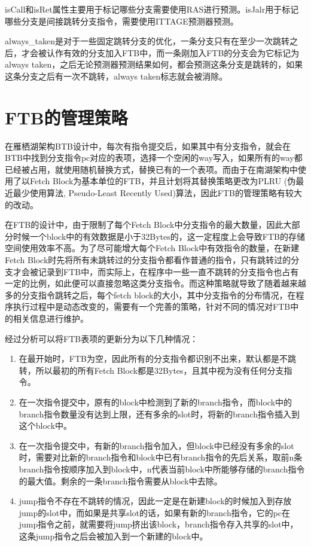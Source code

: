 isCall和isRet属性主要用于标记哪些分支需要使用RAS进行预测。isJalr用于标记哪些分支是间接跳转分支指令，需要使用ITTAGE预测器预测。

always\_taken是对于一些固定跳转分支的优化，一条分支只有在至少一次跳转之后，才会被认作有效的分支加入FTB中，而一条刚加入FTB的分支会为它标记为always taken，之后无论预测器预测结果如何，都会预测这条分支是跳转的，如果这条分支之后有一次不跳转，always taken标志就会被消除。

\section{FTB的管理策略}

在雁栖湖架构BTB设计中，每次有指令提交后，如果其中有分支指令，就会在BTB中找到分支指令pc对应的表项，选择一个空闲的way写入，如果所有的way都已经被占用，就使用随机替换方式，替换已有的一个表项。而由于在南湖架构中使用了以Fetch Block为基本单位的FTB，并且计划将其替换策略更改为PLRU (伪最近最少使用算法, Pseudo-Least Recently Used)算法，因此FTB的管理策略有较大的改动。

在FTB的设计中，由于限制了每个Fetch Block中分支指令的最大数量，因此大部分时候一个block中的有效数据是小于32Bytes的，这一定程度上会导致FTB的存储空间使用效率不高。为了尽可能增大每个Fetch Block中有效指令的数量，在新建Fetch Block时先将所有未跳转过的分支指令都看作普通的指令，只有跳转过的分支才会被记录到FTB中，而实际上，在程序中一些一直不跳转的分支指令也占有一定的比例，如此便可以直接忽略这类分支指令。而这种策略就导致了随着越来越多的分支指令跳转之后，每个fetch block的大小，其中分支指令的分布情况，在程序执行过程中是动态改变的，需要有一个完善的策略，针对不同的情况对FTB中的相关信息进行维护。

经过分析可以将FTB表项的更新分为以下几种情况：

\begin{enumerate}
	\item 在最开始时，FTB为空，因此所有的分支指令都识别不出来，默认都是不跳转，所以最初的所有Fetch Block都是32Bytes，且其中视为没有任何分支指令。
	\item 在一次指令提交中，原有的block中检测到了新的branch指令，而block中的branch指令数量没有达到上限，还有多余的slot时，将新的branch指令插入到这个block中。
	\item 在一次指令提交中，有新的branch指令加入，但block中已经没有多余的slot时，需要对比新的branch指令和block中已有branch指令的先后关系，取前n条branch指令按顺序加入到block中，n代表当前block中所能够存储的branch指令的最大值。剩余的一条branch指令需要从block中去除。
	\item jump指令不存在不跳转的情况，因此一定是在新建block的时候加入到存放jump的slot中，而如果是共享slot的话，如果有新的branch指令，它的pc在jump指令之前，就需要将jump挤出该block，branch指令存入共享的slot中，这条jump指令之后会被加入到一个新建的block中。
\end{enumerate}

